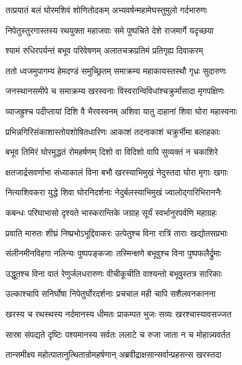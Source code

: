 
\twolineshloka
{तत्प्रयातं बलं घोरमशिवं शोणितोदकम्}
{अभ्यवर्षन्महामेघस्तुमुलो गर्दभारुणः} %

\twolineshloka
{निपेतुस्तुरगास्तस्य रथयुक्ता महाजवाः}
{समे पुष्पचिते देशे राजमार्गे यदृच्छया} %

\twolineshloka
{श्यामं रुधिरपर्यन्तं बभूव परिवेषणम्}
{अलातचक्रप्रतिमं प्रतिगृह्य दिवाकरम्} %

\twolineshloka
{ततो ध्वजमुपागम्य हेमदण्डं समुच्छ्रितम्}
{समाक्रम्य महाकायस्तस्थौ गृध्रः सुदारुणः} %

\twolineshloka
{जनस्थानसमीपे च समाक्रम्य खरस्वनाः}
{विस्वरान्विविधांश्चक्रुर्मांसादा मृगपक्षिणः} %

\twolineshloka
{व्याजह्रुश्च पदीप्तायां दिशि वै भैरवस्वनम्}
{अशिवा यातु दाहानां शिवा घोरा महास्वनाः} %

\twolineshloka
{प्रभिन्नगिरिसंकाशास्तोयशोषितधारिणः}
{आकाशं तदनाकाशं चक्रुर्भीमा बलाहकाः} %

\twolineshloka
{बभूव तिमिरं घोरमुद्धतं रोमहर्षणम्}
{दिशो वा विदिशो वापि सुव्यक्तं न चकाशिरे} %

\twolineshloka
{क्षतजार्द्रसवर्णाभा संध्याकालं विना बभौ}
{खरस्याभिमुखं नेदुस्तदा घोरा मृगाः खगाः} %

\twolineshloka
{नित्याशिवकरा युद्धे शिवा घोरनिदर्शनाः}
{नेदुर्बलस्याभिमुखं ज्वालोद्गारिभिराननैः} %

\twolineshloka
{कबन्धः परिघाभासो दृश्यते भास्करान्तिके}
{जग्राह सूर्यं स्वर्भानुरपर्वणि महाग्रहः} %

\twolineshloka
{प्रवाति मारुतः शीघ्रं निष्प्रभोऽभूद्दिवाकरः}
{उत्पेतुश्च विना रात्रिं ताराः खद्योतसप्रभाः} %

\twolineshloka
{संलीनमीनविहगा नलिन्यः पुष्पपङ्कजाः}
{तस्मिन्क्षणे बभूवुश्च विना पुष्पफलैर्द्रुमाः} %

\twolineshloka
{उद्धूतश्च विना वातं रेणुर्जलधरारुणः}
{वीचीकूचीति वाश्यन्तो बभूवुस्तत्र सारिकाः} %

\twolineshloka
{उल्काश्चापि सनिर्घोषा निपेतुर्घोरदर्शनाः}
{प्रचचाल मही चापि सशैलवनकानना} %

\twolineshloka
{खरस्य च रथस्थस्य नर्दमानस्य धीमतः}
{प्राकम्पत भुजः सव्यः खरश्चास्यावसज्जत} %

\twolineshloka
{सास्रा संपद्यते दृष्टिः पश्यमानस्य सर्वतः}
{ललाटे च रुजा जाता न च मोहान्न्यवर्तत} %

\twolineshloka
{तान्समीक्ष्य महोत्पातानुत्थितान्रोमहर्षणान्}
{अब्रवीद्राक्षसान्सर्वान्प्रहसन्स खरस्तदा} %

